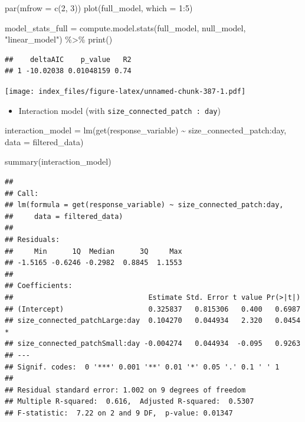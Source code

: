 \documentclass[
]{article}
\newenvironment{Shaded}{\begin{snugshade}}{\end{snugshade}}
\newcommand{\AttributeTok}[1]{\textcolor[rgb]{0.77,0.63,0.00}{#1}}
\newcommand{\DecValTok}[1]{\textcolor[rgb]{0.00,0.00,0.81}{#1}}
\newcommand{\FunctionTok}[1]{\textcolor[rgb]{0.00,0.00,0.00}{#1}}
\newcommand{\NormalTok}[1]{#1}
\newcommand{\OtherTok}[1]{\textcolor[rgb]{0.56,0.35,0.01}{#1}}
\newcommand{\SpecialCharTok}[1]{\textcolor[rgb]{0.00,0.00,0.00}{#1}}
\newcommand{\StringTok}[1]{\textcolor[rgb]{0.31,0.60,0.02}{#1}}
\providecommand{\tightlist}{%
  \setlength{\itemsep}{0pt}\setlength{\parskip}{0pt}}
\begin{document}
\begin{Shaded}
\begin{Highlighting}[]
\FunctionTok{par}\NormalTok{(}\AttributeTok{mfrow =} \FunctionTok{c}\NormalTok{(}\DecValTok{2}\NormalTok{, }\DecValTok{3}\NormalTok{))}
\FunctionTok{plot}\NormalTok{(full\_model, }\AttributeTok{which =} \DecValTok{1}\SpecialCharTok{:}\DecValTok{5}\NormalTok{)}

\NormalTok{model\_stats\_full }\OtherTok{=} \FunctionTok{compute.model.stats}\NormalTok{(full\_model,}
\NormalTok{                                       null\_model,}
                                       \StringTok{"linear\_model"}\NormalTok{) }\SpecialCharTok{\%\textgreater{}\%}
  \FunctionTok{print}\NormalTok{()}
\end{Highlighting}
\end{Shaded}

\begin{verbatim}
##    deltaAIC    p_value   R2
## 1 -10.02038 0.01048159 0.74
\end{verbatim}

\texttt{[image: index\_files/figure-latex/unnamed-chunk-387-1.pdf]}

\begin{itemize}
\tightlist
\item
  Interaction model (with \texttt{size\_connected\_patch\ :\ day})
\end{itemize}

\begin{Shaded}
\begin{Highlighting}[]
\NormalTok{interaction\_model }\OtherTok{=} \FunctionTok{lm}\NormalTok{(}\FunctionTok{get}\NormalTok{(response\_variable) }\SpecialCharTok{\textasciitilde{}}
\NormalTok{                         size\_connected\_patch}\SpecialCharTok{:}\NormalTok{day,}
                       \AttributeTok{data =}\NormalTok{ filtered\_data)}

\FunctionTok{summary}\NormalTok{(interaction\_model)}
\end{Highlighting}
\end{Shaded}

\begin{verbatim}
## 
## Call:
## lm(formula = get(response_variable) ~ size_connected_patch:day, 
##     data = filtered_data)
## 
## Residuals:
##     Min      1Q  Median      3Q     Max 
## -1.5165 -0.6246 -0.2982  0.8845  1.1553 
## 
## Coefficients:
##                                Estimate Std. Error t value Pr(>|t|)  
## (Intercept)                    0.325837   0.815306   0.400   0.6987  
## size_connected_patchLarge:day  0.104270   0.044934   2.320   0.0454 *
## size_connected_patchSmall:day -0.004274   0.044934  -0.095   0.9263  
## ---
## Signif. codes:  0 '***' 0.001 '**' 0.01 '*' 0.05 '.' 0.1 ' ' 1
## 
## Residual standard error: 1.002 on 9 degrees of freedom
## Multiple R-squared:  0.616,  Adjusted R-squared:  0.5307 
## F-statistic:  7.22 on 2 and 9 DF,  p-value: 0.01347
\end{verbatim}
\end{document}
